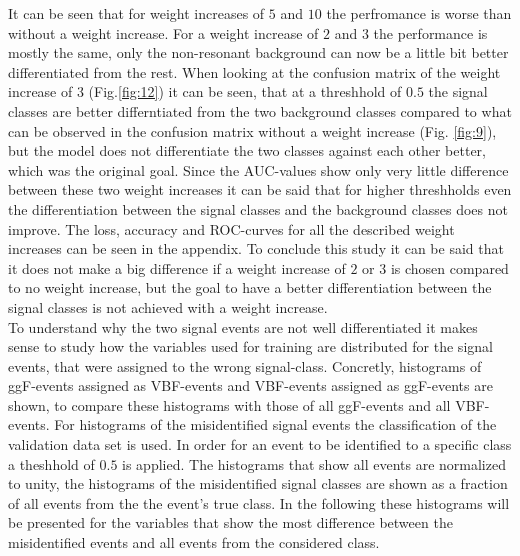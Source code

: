 
It can be seen that for weight increases of $5$ and $10$ the perfromance is worse than without a weight increase. For a weight increase of $2$ and $3$ the performance is mostly the same, only
the non-resonant background can now be a little bit better differentiated from the rest. When looking at the confusion matrix of the weight increase of $3$ (Fig.\ref{fig:12}) it can be seen, that at a threshhold of $0.5$
the signal classes are better differntiated from the two background classes compared to what can be observed in the confusion matrix without a weight increase (Fig. \ref{fig:9}), but the model does not differentiate the two classes against each other better, which was the original goal.
Since the AUC-values show only very little difference between these two weight increases it can be said that for higher threshholds even the differentiation between the signal classes and the background classes
does not improve. The loss, accuracy and ROC-curves for all the described weight increases can be seen in the appendix. To conclude this study it can be said that it does not make a big difference if a weight
increase of $2$ or $3$ is chosen compared to no weight increase, but the goal to have a better differentiation between the signal classes is not achieved with a weight increase. \\

To understand why the two signal events are not well differentiated it makes sense to study how the variables used for training are distributed for the signal events, that were assigned to the wrong signal-class.
Concretly, histograms of ggF-events assigned as VBF-events and VBF-events assigned as ggF-events are shown, to compare these histograms with those of all ggF-events and all VBF-events. For histograms of the misidentified signal events
the classification of the validation data set is used. In order for an event to be identified to a specific class a theshhold of $0.5$ is applied. The histograms that show all events are normalized to unity, the histograms of the misidentified signal classes
are shown as a fraction of all events from the the event's true class.
In the following these histograms will be presented for the variables that show the most difference between the misidentified events and all events from the considered class.


